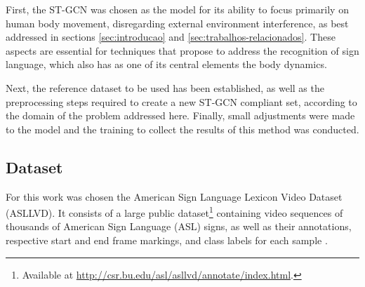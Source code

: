 First, the ST-GCN was chosen as the model for its ability to focus primarily on human body movement, disregarding external environment interference, as best addressed in sections \ref{sec:introducao} and \ref{sec:trabalhos-relacionados}. These aspects are essential for techniques that propose to address the recognition of sign language, which also has as one of its central elements the body dynamics. 


Next, the reference dataset to be used has been established, as well as the preprocessing steps required to create a new ST-GCN compliant set, according to the domain of the problem addressed here. Finally, small adjustments were made to the model and the training to collect the results of this method was conducted.




\subsection{Dataset} %
\label{sec:dataset}

For this work was chosen the American Sign Language Lexicon Video Dataset (ASLLVD). It consists of a large public dataset\footnote{
   Available at \url{http://csr.bu.edu/asl/asllvd/annotate/index.html}.
} containing video sequences of thousands of American Sign Language (ASL) signs, as well as their annotations, respective start and end frame markings, and class labels for each sample \cite{ athitsos-asllvd-2008, neidle-2012, vloger-2012}.

